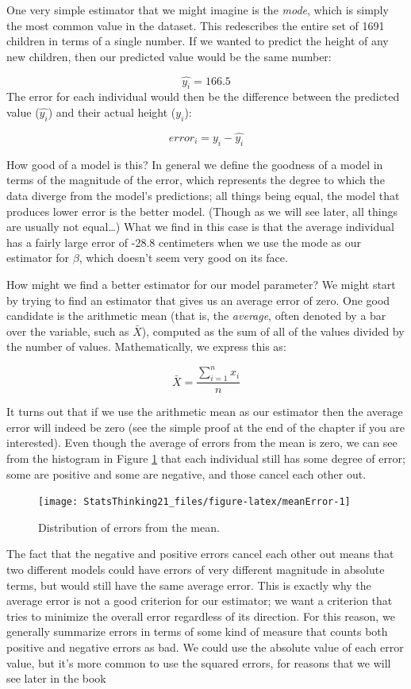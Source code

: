 \documentclass[12pt,]{book}
\theoremstyle{definition}
\theoremstyle{definition}
\theoremstyle{definition}
\theoremstyle{remark}
\begin{document}
One very simple estimator that we might imagine is the \emph{mode}, which is simply the most common value in the dataset. This redescribes the entire set of 1691 children in terms of a single number. If we wanted to predict the height of any new children, then our predicted value would be the same number:

\[
\hat{y_i} = 166.5
\]
The error for each individual would then be the difference between the predicted value (\(\hat{y_i}\)) and their actual height (\(y_i\)):

\[
error_i = y_i - \hat{y_i}
\]

How good of a model is this? In general we define the goodness of a model in terms of the magnitude of the error, which represents the degree to which the data diverge from the model's predictions; all things being equal, the model that produces lower error is the better model. (Though as we will see later, all things are usually not equal\ldots{})
What we find in this case is that the average individual has a fairly large error of -28.8 centimeters when we use the mode as our estimator for \(\beta\), which doesn't seem very good on its face.

How might we find a better estimator for our model parameter? We might start by trying to find an estimator that gives us an average error of zero. One good candidate is the arithmetic mean (that is, the \emph{average}, often denoted by a bar over the variable, such as \(\bar{X}\)), computed as the sum of all of the values divided by the number of values. Mathematically, we express this as:

\[
\bar{X} = \frac{\sum_{i=1}^{n}x_i}{n}
\]

It turns out that if we use the arithmetic mean as our estimator then the average error will indeed be zero (see the simple proof at the end of the chapter if you are interested). Even though the average of errors from the mean is zero, we can see from the histogram in Figure \ref{fig:meanError} that each individual still has some degree of error; some are positive and some are negative, and those cancel each other out.

\begin{figure}
\texttt{[image: StatsThinking21\_files/figure-latex/meanError-1]} \caption{Distribution of errors from the mean.}\label{fig:meanError}
\end{figure}

The fact that the negative and positive errors cancel each other out means that two different models could have errors of very different magnitude in absolute terms, but would still have the same average error. This is exactly why the average error is not a good criterion for our estimator; we want a criterion that tries to minimize the overall error regardless of its direction. For this reason, we generally summarize errors in terms of some kind of measure that counts both positive and negative errors as bad. We could use the absolute value of each error value, but it's more common to use the squared errors, for reasons that we will see later in the book
\end{document}
